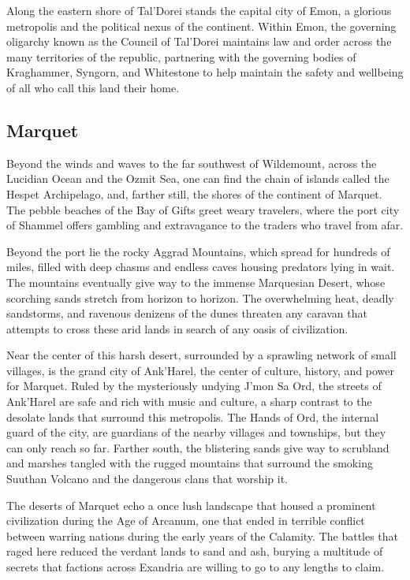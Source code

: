 \documentclass[10pt,a4paper,twoside,bg=print,twocolumn,openany,nodeprecatedcode]{dndbook}
\begin{document}
Along the eastern shore of Tal'Dorei stands the capital city of Emon, a glorious metropolis and the political nexus of the continent. Within Emon, the governing oligarchy known as the Council of Tal'Dorei maintains law and order across the many territories of the republic, partnering with the governing bodies of Kraghammer, Syngorn, and Whitestone to help maintain the safety and wellbeing of all who call this land their home.

\subsection{Marquet}
Beyond the winds and waves to the far southwest of Wildemount, across the Lucidian Ocean and the Ozmit Sea, one can find the chain of islands called the Hespet Archipelago, and, farther still, the shores of the continent of Marquet. The pebble beaches of the Bay of Gifts greet weary travelers, where the port city of Shammel offers gambling and extravagance to the traders who travel from afar.

Beyond the port lie the rocky Aggrad Mountains, which spread for hundreds of miles, filled with deep chasms and endless caves housing predators lying in wait. The mountains eventually give way to the immense Marquesian Desert, whose scorching sands stretch from horizon to horizon. The overwhelming heat, deadly sandstorms, and ravenous denizens of the dunes threaten any caravan that attempts to cross these arid lands in search of any oasis of civilization.

Near the center of this harsh desert, surrounded by a sprawling network of small villages, is the grand city of Ank'Harel, the center of culture, history, and power for Marquet. Ruled by the mysteriously undying J'mon Sa Ord, the streets of Ank'Harel are safe and rich with music and culture, a sharp contrast to the desolate lands that surround this metropolis. The Hands of Ord, the internal guard of the city, are guardians of the nearby villages and townships, but they can only reach so far. Farther south, the blistering sands give way to scrubland and marshes tangled with the rugged mountains that surround the smoking Suuthan Volcano and the dangerous clans that worship it.

The deserts of Marquet echo a once lush landscape that housed a prominent civilization during the Age of Arcanum, one that ended in terrible conflict between warring nations during the early years of the Calamity. The battles that raged here reduced the verdant lands to sand and ash, burying a multitude of secrets that factions across Exandria are willing to go to any lengths to claim.
\end{document}
